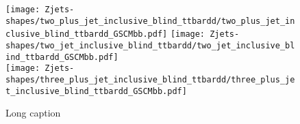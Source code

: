 \begin{figure}[!htb]
  \centering
  \texttt{[image: Zjets-shapes/two\_plus\_jet\_inclusive\_blind\_ttbardd/two\_plus\_jet\_inclusive\_blind\_ttbardd\_GSCMbb.pdf]}
  \texttt{[image: Zjets-shapes/two\_jet\_inclusive\_blind\_ttbardd/two\_jet\_inclusive\_blind\_ttbardd\_GSCMbb.pdf]} \\
  \texttt{[image: Zjets-shapes/three\_plus\_jet\_inclusive\_blind\_ttbardd/three\_plus\_jet\_inclusive\_blind\_ttbardd\_GSCMbb.pdf]}
  \caption[Subtracted data versus the nominal $Z+$jets prediction, GSC $m_{bb}$.]{Long caption}
  \label{fig:zjets-mbb-shapes}
\end{figure}